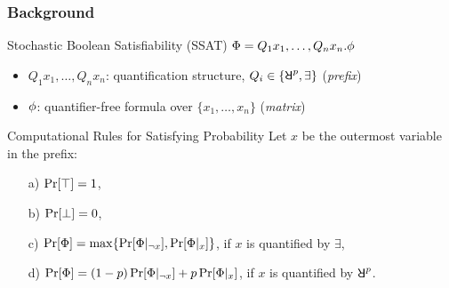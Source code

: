 \begin{frame}
      \frametitle{Background}
      \begin{block}{Stochastic Boolean Satisfiability (SSAT)}
            $\Phi=Q_1 x_1,\ldots,Q_n x_n.\phi$
            \pause
            \begin{itemize}
                  \item $Q_1 x_1,\ldots,Q_n x_n$: quantification structure, $Q_i \in \{\random{p},\exists\}$ (\emph{prefix})
                        \pause
                  \item $\phi$: quantifier-free formula over $\{x_1,\ldots,x_n\}$ (\emph{matrix})
            \end{itemize}
      \end{block}
      \pause
      \begin{block}{Computational Rules for Satisfying Probability}
            Let $x$ be the outermost variable in the prefix:
            \pause
            \begin{enumerate}
                  \item[a)] $\Pr[\top]=1$,
                        \pause
                  \item[b)] $\Pr[\bot]=0$,
                        \pause
                  \item[c)] $\Pr[\Phi]=\max\{\Pr[\Phi|_{\lnot x}],\Pr[\Phi|_{x}]\}$, if $x$ is quantified by $\exists$,
                        \pause
                  \item[d)] $\Pr[\Phi]=(1-p)\Pr[\Phi|_{\lnot x}]+p\Pr[\Phi|_{x}]$, if $x$ is quantified by $\random{p}$.
            \end{enumerate}
      \end{block}
\end{frame}

